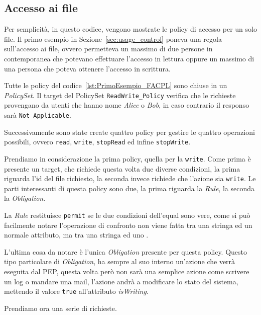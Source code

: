 \subsection{Accesso ai file} %
\label{ssub:primo_esempio}

Per semplicità, in questo codice, vengono mostrate le policy di accesso per un solo file.
Il primo esempio in Sezione~\ref{sec:usage_control} poneva una regola sull'accesso ai file, ovvero permetteva un massimo di due persone in contemporanea che potevano effettuare l'accesso in lettura oppure un massimo di una persona che poteva ottenere l'accesso in scrittura.\\ \par
Tutte le policy del codice~\ref{lst:PrimoEsempio_FACPL} sono chiuse in un \textit{PolicySet}. Il target del PolicySet \texttt{ReadWrite\_Policy} verifica che le richieste provengano da utenti che hanno nome \textit{Alice} o \textit{Bob}, in caso contrario il responso sarà \texttt{Not Applicable}.\\ \par
Successivamente sono state create quattro policy per gestire le quattro operazioni possibili, ovvero \texttt{read}, \texttt{write}, \texttt{stopRead} ed infine \texttt{stopWrite}.\\ \par
Prendiamo in considerazione la prima policy, quella per la \texttt{write}. Come prima è presente un target, che richiede questa volta due diverse condizioni, la prima riguarda l'id del file richiesto, la seconda invece richiede che l'azione sia \texttt{write}. Le parti interessanti di questa policy sono due, la prima riguarda la \textit{Rule}, la seconda la \textit{Obligation}.\\ \par
La \textit{Rule} restituisce \texttt{permit} se le due condizioni dell'equal sono vere, come si può facilmente notare l'operazione di confronto non viene fatta tra una stringa ed un normale attributo, ma tra una stringa ed uno \statusattribute.\\ \par
L'ultima cosa da notare è l'unica \textit{Obligation} presente per questa policy. Questo tipo particolare di \textit{Obligation}, ha sempre al suo interno un'azione che verrà eseguita dal PEP, questa volta però non sarà una semplice azione come scrivere un log o mandare una mail, l'azione andrà a modificare lo stato del sistema, mettendo il valore \texttt{true} all'attributo \textit{isWriting}.\\ \par
Prendiamo ora una serie di richieste.


